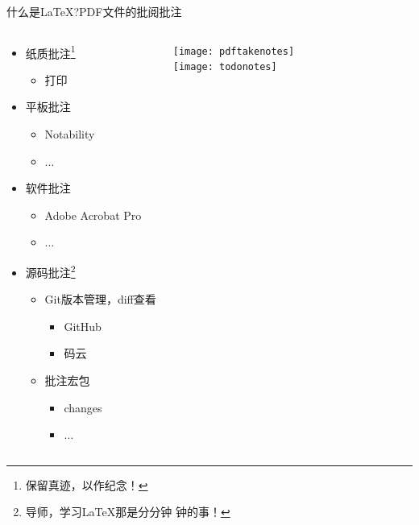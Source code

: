 \documentclass[fontset = adobe, xcolor=svgnames, t, aspectratio=169]{ctexbeamer}
\begin{document}
\begin{frame}[t]{什么是\LaTeX?}{PDF文件的批阅批注}
  \begin{columns}[c]
    \begin{spacing}{0.9}
    \begin{itemize}%
    \item \alert{纸质}批注\footnote[frame]{保留\alert{真迹}，以作纪念！}
      \begin{itemize}
      \item 打印
      \end{itemize}
    \item
      \alert{平板}批注\footnotemark[\value{footnote}]%
      \begin{itemize}
      \item Notability
      \item $\ldots$
      \end{itemize}
    \item \alert{软件}批注
      \begin{itemize}
      \item Adobe Acrobat Pro
      \item $\ldots$
      \end{itemize}
    \item \alert{源码}批注\footnote[frame]{导师，学习\LaTeX 那是\alert{分分钟
          钟}的事！}
      \begin{itemize}
      \item Git版本管理，diff查看
        \begin{itemize}
        \item {GitHub}
        \item {码云}
        \end{itemize}
      \item 批注宏包
        \begin{itemize}
        \item changes
        \item $\ldots$
        \end{itemize}
      \end{itemize}
    \end{itemize}
    \end{spacing}
  \begin{center}
    \texttt{[image: pdftakenotes]}\\
    \texttt{[image: todonotes]}
  \end{center}
\end{columns}
\end{frame}
\end{document}
